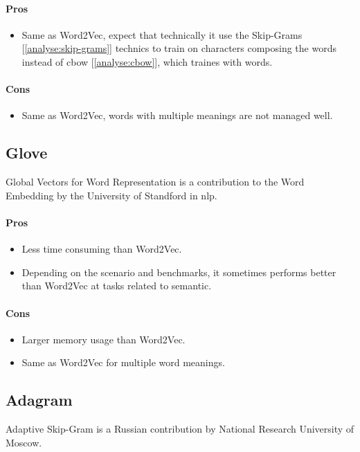 \paragraph{Pros}
\begin{itemize}
    \setlength\itemsep{0em}
    \item Same as Word2Vec, expect that technically it use the Skip-Grams [\ref{analyse:skip-grams}] technics to train on characters composing the words instead of \gls{cbow} [\ref{analyse:cbow}], which traines with words.
\end{itemize}
\paragraph{Cons}
\begin{itemize}
    \setlength\itemsep{0em}
    \item Same as Word2Vec, words with multiple meanings are not managed well.
\end{itemize}


\subsection{Glove\cite{article:glove}}
Global Vectors for Word Representation is a contribution to the Word Embedding by the University of Standford in \gls{nlp}.
\paragraph{Pros}
\begin{itemize}
    \setlength\itemsep{0em}
    \item Less time consuming than Word2Vec.
    \item Depending on the scenario and benchmarks, it sometimes performs better than Word2Vec at tasks related to semantic.
\end{itemize}
\paragraph{Cons}
\begin{itemize}
    \setlength\itemsep{0em}
    \item Larger memory usage than Word2Vec.
    \item Same as Word2Vec for multiple word meanings.
\end{itemize}


\subsection{Adagram\cite{article:adagram}}
\label{sec:adagram}
Adaptive Skip-Gram is a Russian contribution by National Research University of Moscow.
